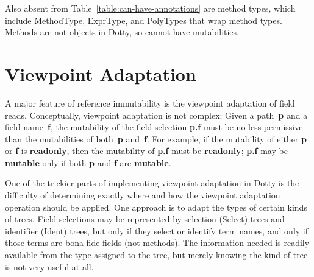 \documentclass[11pt]{report}
\newcommand{\cdf}{\bf\ttfamily} %
\newcommand{\cd}{\cdf\small}  %
\begin{document}
Also absent from Table~\ref{table:can-have-annotations} are method types, which include MethodType, ExprType, and PolyTypes that wrap method types. Methods are not objects in Dotty, so cannot have mutabilities.







\section{Viewpoint Adaptation} \label{sec:viewpoint-adaptation}

A major feature of reference immutability is the viewpoint adaptation of field reads.
Conceptually, viewpoint adaptation is not complex:
Given a path~{\cd p} and a field name~{\cd f}, the mutability of the field selection \mbox{\cd p.f} must be no less permissive than the mutabilities of
both~{\cd p} and~{\cd f}. For example, if the mutability of either {\cd p} or {\cd f} is {\cd readonly}, then the mutability of \mbox{\cd p.f}
must be {\cd readonly}; \mbox{\cd p.f} may be {\cd mutable} only if both {\cd p} and {\cd f} are {\cd mutable}.

One of the trickier parts of implementing viewpoint adaptation in Dotty is the difficulty of determining exactly where and how the viewpoint adaptation
operation should be applied. One approach is to adapt the types of certain kinds of trees. Field selections may be represented by selection (Select) trees and identifier (Ident) trees, but only if they select or identify term names, and only if those terms are bona fide fields (not methods). The information needed is readily available from the type assigned to the tree, but merely knowing the kind of tree is not very useful at all.
\end{document}
